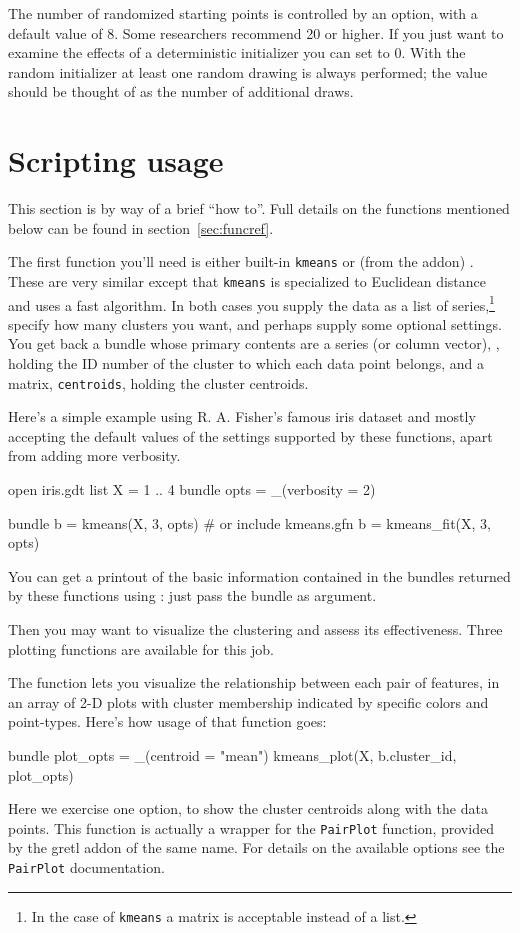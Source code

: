 \documentclass{article}
\begin{document}
The number of randomized starting points is controlled by an
 option, with a default value of 8. Some researchers
recommend 20 or higher. If you just want to examine the effects of a
deterministic initializer you can set  to 0. With the
random initializer at least one random drawing is always performed; the
 value should be thought of as the number of additional
draws.

\section{Scripting usage}
\label{sec:scripting}

This section is by way of a brief ``how to''. Full details on the
functions mentioned below can be found in section~\ref{sec:funcref}.

The first function you'll need is either built-in \texttt{kmeans} or
(from the addon) . These are very similar except that
\texttt{kmeans} is specialized to Euclidean distance and uses a fast
algorithm. In both cases you supply the data as a list of
series,\footnote{In the case of \texttt{kmeans} a matrix is acceptable
  instead of a list.}  specify how many clusters you want, and perhaps
supply some optional settings. You get back a bundle whose primary
contents are a series (or column vector), , holding the
ID number of the cluster to which each data point belongs, and a matrix,
\texttt{centroids}, holding the cluster centroids.

Here's a simple example using R. A. Fisher's famous \textsf{iris}
dataset and mostly accepting the default values of the settings
supported by these functions, apart from adding more verbosity.
\begin{code}
open iris.gdt
list X = 1 .. 4
bundle opts = _(verbosity = 2)

bundle b = kmeans(X, 3, opts)
# or
include kmeans.gfn
b = kmeans_fit(X, 3, opts)
\end{code}

You can get a printout of the basic information contained in the bundles
returned by these functions using : just pass the
bundle as argument.

Then you may want to visualize the clustering and assess its
effectiveness. Three plotting functions are available for this job.

The  function lets you visualize the relationship
between each pair of features, in an array of 2-D plots with cluster
membership indicated by specific colors and point-types.  Here's how
usage of that function goes:
\begin{code}
bundle plot_opts = _(centroid = "mean")
kmeans_plot(X, b.cluster_id, plot_opts)
\end{code}
Here we exercise one option, to show the cluster centroids along with
the data points. This function is actually a wrapper for the
\texttt{PairPlot} function, provided by the gretl addon of the same
name. For details on the available options see the \texttt{PairPlot}
documentation.
\end{document}
